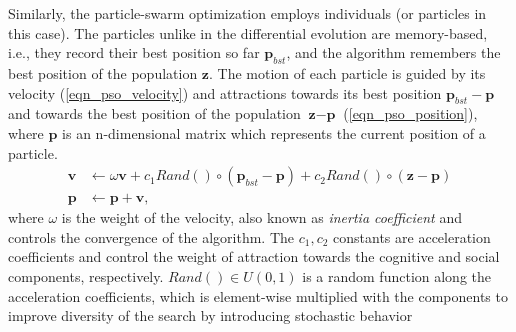 Similarly, the particle-swarm optimization employs individuals (or particles in this case). The particles unlike in the differential evolution are memory-based, i.e., they record their best position so far $\textbf{p}_{bst}$, and the algorithm remembers the best position of the population $\textbf{z}$. The motion of each particle is guided by its velocity (\ref{eqn_pso_velocity}) and attractions towards its best position $\textbf{p}_{bst}-\textbf{p}$ and towards the best position of the population $\textbf{z}-\textbf{p}$ (\ref{eqn_pso_position}), where $\textbf{p}$ is an n-dimensional matrix which represents the current position of a particle.
\begin{align}
\label{eqn_pso_velocity}
\textbf{v} &\leftarrow  \omega\textbf{v} + c_1Rand()\circ(\textbf{p}_{bst}-\textbf{p}) + c_2Rand()\circ(\textbf{z}-\textbf{p})\\
\label{eqn_pso_position}
\textbf{p} &\leftarrow \textbf{p} + \textbf{v},
\end{align}
where $\omega$ is the weight of the velocity, also known as \textit{inertia coefficient} and controls the convergence of the algorithm. The $c_1, c_2$ constants are acceleration coefficients and control the weight of attraction towards the cognitive and social components, respectively. $Rand()\in U(0,1)$ is a random function along the acceleration coefficients, which is element-wise multiplied with the components to improve diversity of the search by introducing stochastic behavior
